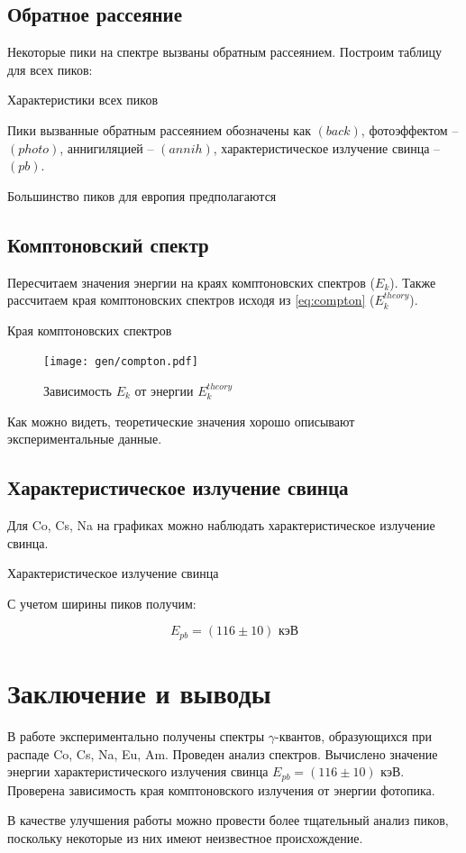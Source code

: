 \documentclass[12pt,a4paper]{article}
\begin{document}
	\newpage
	\subsection*{Обратное рассеяние}
	
	Некоторые пики на спектре вызваны обратным рассеянием. Построим таблицу для всех пиков:
	
	\begin{table}[H]
		\footnotesize
		
		\caption{Характеристики всех пиков}
	\end{table}
	
	Пики вызванные обратным рассеянием обозначены как $(back)$, фотоэффектом -- $(photo)$, аннигиляцией -- $(annih)$, характеристическое излучение свинца -- $(pb)$.
	
	Большинство пиков для европия предполагаются 
	
	
	\subsection*{Комптоновский спектр}
	
	Пересчитаем значения энергии на краях комптоновских спектров ($E_k$). Также рассчитаем края комптоновских спектров исходя из \eqref{eq:compton} ($E_k^{theory}$).
	\begin{table}[H]
		
		\caption{Края комптоновских спектров}
	\end{table}
	
	\begin{figure}[H]
		\centering
		\texttt{[image: gen/compton.pdf]}
		\caption{Зависимость $E_k$ от энергии $E_k^{theory}$}
		\label{fig:E_k}
	\end{figure}
	
	Как можно видеть, теоретические значения хорошо описывают экспериментальные данные.
	
	\subsection*{Характеристическое излучение свинца}
	
	Для Co, Cs, Na на графиках можно наблюдать характеристическое излучение свинца.

	\begin{table}[H]
		
		\caption{Характеристическое излучение свинца}
	\end{table}
	
	С учетом ширины пиков получим:
	
	$$ E_{pb} = (116 \pm 10) \text{ кэВ} $$
	
	\section*{Заключение и выводы}
	
	В работе экспериментально получены спектры $\gamma$-квантов, образующихся при распаде Co, Cs, Na, Eu, Am. Проведен анализ спектров. Вычислено значение энергии характеристического излучения свинца $E_{pb} = (116 \pm 10) \text{ кэВ}$. Проверена зависимость края комптоновского излучения от энергии фотопика.
	
	В качестве улучшения работы можно провести более тщательный анализ пиков, поскольку некоторые из них имеют неизвестное происхождение.
	
\end{document}
